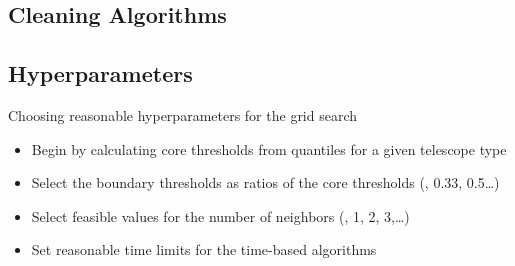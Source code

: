 \subsection{Cleaning Algorithms}%
\label{sub:Cleaning_algorithms}

    {%
    
    }
    {%
    
    }

\subsection{Hyperparameters}%
\label{sub:Hyperparameters}
\begin{frame}[t]{Choosing reasonable hyperparameters for the grid search}
    \begin{overlayarea}{\textwidth}{2.3cm}
        \begin{itemize}
            \item<1-> Begin by calculating core thresholds from quantiles for a given telescope type
            \item<3-> Select the boundary thresholds as ratios of the core thresholds (, 0.33, 0.5\dots)
            \item<4-> Select feasible values for the number of neighbors (, 1, 2, 3,\dots)
            \item<5-> Set reasonable time limits for the time-based algorithms
        \end{itemize}
    \end{overlayarea}
    \begin{overlayarea}{\textwidth}{\textheight}
    \end{overlayarea}
\end{frame}